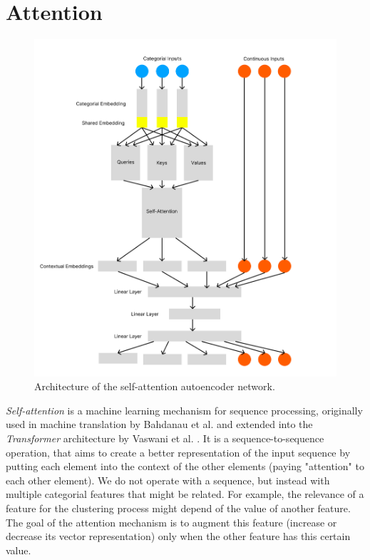 \section{Attention}

\begin{figure}
	\includegraphics[width=1.2\linewidth]{attention_autoencoder.png}
	\caption{Architecture of the self-attention autoencoder network.}
	\label{attention_architecture}
\end{figure}

\textit{Self-attention} is a machine learning mechanism for sequence processing, originally used in machine translation by Bahdanau et al. \cite{bahdanau} and extended into the \textit{Transformer} architecture by Vaswani et al. \cite{attention_is_all_you_need}. It is a sequence-to-sequence operation, that aims to create a better representation of the input sequence by putting each element into the context of the other elements (paying "attention" to each other element). We do not operate with a sequence, but instead with multiple categorial features that might be related. For example, the relevance of a feature for the clustering process might depend of the value of another feature. The goal of the attention mechanism is to augment this feature (increase or decrease its vector representation) only when the other feature has this certain value. 

